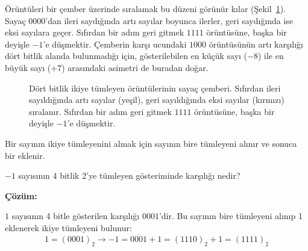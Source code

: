 Örüntüleri bir çember üzerinde sıralamak bu düzeni görünür kılar (Şekil~\ref{fig:tumleyen-cember}). Sayaç $0000$'dan ileri saydığında artı sayılar boyunca ilerler, geri saydığında ise eksi sayılara geçer. Sıfırdan bir adım geri gitmek $1111$ örüntüsüne, başka bir deyişle $-1$'e düşmektir. Çemberin karşı ucundaki $1000$ örüntüsünün artı karşılığı dört bitlik alanda bulunmadığı için, gösterilebilen en küçük sayı ($-8$) ile en büyük sayı ($+7$) arasındaki asimetri de buradan doğar.

\begin{figure}[H]
\centering
{}
\caption[İkiye tümleyen sayaç çemberi]{Dört bitlik ikiye tümleyen örüntülerinin sayaç çemberi. Sıfırdan ileri sayıldığında artı sayılar (yeşil), geri sayıldığında eksi sayılar (kırmızı) sıralanır. Sıfırdan bir adım geri gitmek $1111$ örüntüsüne, başka bir deyişle $-1$'e düşmektir.}
\label{fig:tumleyen-cember}
\end{figure}

Bir sayının ikiye tümleyenini almak için sayının bire tümleyeni alınır ve sonuca bir eklenir.

\begin{ornek}[A.12]
$-1$ sayısının 4 bitlik 2'ye tümleyen gösteriminde karşılığı nedir?

\textbf{Çözüm:}

$1$ sayısının 4 bitle gösterilen karşılığı $0001$'dir. Bu sayının bire tümleyeni alınıp 1 eklenerek ikiye tümleyeni bulunur:
\[
1 = (0001)_2 \rightarrow -1 = \overline{0001} + 1 = (1110)_2 + 1 = (1111)_2
\]
\end{ornek}


